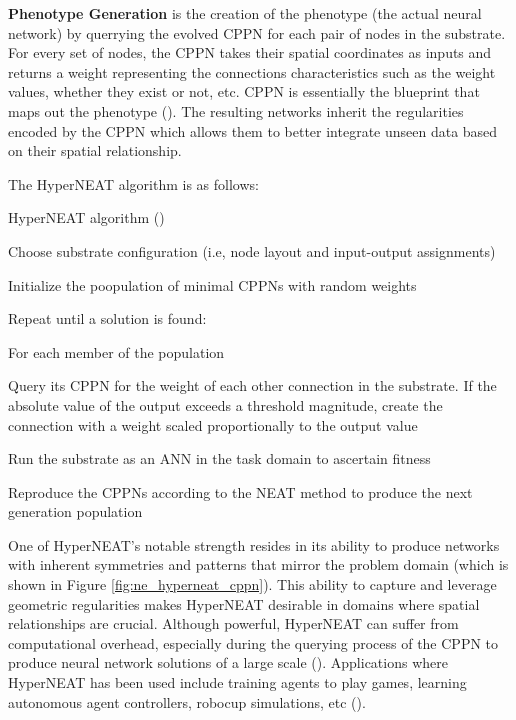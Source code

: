 \noindent \textbf{Phenotype Generation} is the creation of the phenotype (the actual neural network) by querrying the evolved CPPN for each pair of nodes in the substrate. For every set of nodes, the CPPN takes their spatial coordinates as inputs and returns a weight  representing the connections characteristics such as the weight values, whether they exist or not, etc. CPPN is essentially the blueprint that maps out the phenotype (\cite{stanley2009hypercube}). The resulting networks inherit the regularities encoded by the CPPN which allows them to better integrate unseen data based on their spatial relationship. \bigskip

\noindent The HyperNEAT algorithm is as follows:

\begin{algorithm}[H]
	\caption{HyperNEAT algorithm (\cite{stanley2009hypercube})}\label{alg:hyperneat_algorithm}
	\begin{algorithmic}[1]
        \item Choose substrate configuration (i.e, node layout and input-output assignments)
        \item Initialize the poopulation of minimal CPPNs with random weights
        \item Repeat until a solution is found:
        \item \:\: For each member of the population
        \item \:\:\:\: Query its CPPN for the weight of each other connection in the substrate. If the absolute value of the output exceeds a threshold magnitude, create the connection with a weight scaled proportionally to the output value
        \item \:\:\:\: Run the substrate as an ANN in the task domain to ascertain fitness
        \item \:\: Reproduce the CPPNs according to the NEAT method to produce the next generation population
    \end{algorithmic}
\end{algorithm}

\noindent One of HyperNEAT's notable strength resides in its ability to produce networks with inherent symmetries and patterns that mirror the problem domain (which is shown in Figure \ref{fig:ne_hyperneat_cppn}). This ability to capture and leverage geometric regularities makes HyperNEAT desirable in domains where spatial relationships are crucial. Although powerful, HyperNEAT can suffer from computational overhead, especially during the querying process of the CPPN to produce neural network solutions of a large scale (\cite{stanley2009hypercube}). Applications where HyperNEAT has been used include training agents to play games, learning autonomous agent controllers, robocup simulations, etc (\cite{kowaliw2014growing}).
